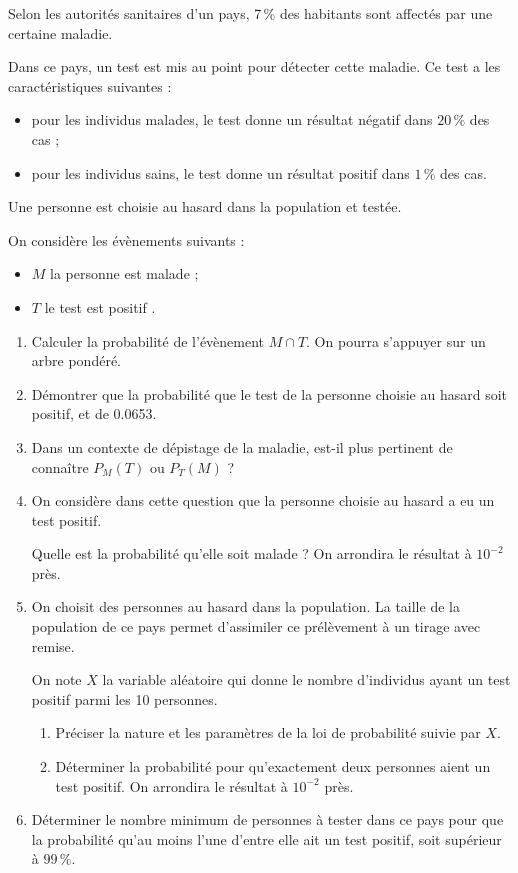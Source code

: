 Selon les autorités sanitaires d'un pays, 7\,\% des habitants sont affectés par une certaine maladie.

Dans ce pays, un test est mis au point pour détecter cette maladie. Ce test a les caractéristiques suivantes :
%
\begin{itemize}
	\item pour les individus malades, le test donne un résultat négatif dans $20 \,\%$ des cas ;
	\item pour les individus sains, le test donne un résultat positif dans $1\,\%$ des cas.
\end{itemize}
%
Une personne est choisie au hasard dans la population et testée.

On considère les évènements suivants :
%
\begin{itemize}
	\item $M$ \og la personne est malade \fg{} ;
	\item $T$ \og le test est positif \fg{}.
\end{itemize}

\begin{enumerate}
	\item Calculer la probabilité de l'évènement $M \cap T$. On pourra s'appuyer sur un arbre pondéré.
	\item Démontrer que la probabilité que le test  de la personne choisie au hasard soit positif, et de \num{0,0653}.
	\item Dans un contexte de dépistage de la maladie, est-il plus pertinent de connaître $P_M(T)$ ou $P_T(M)$ ?
	\item On considère dans cette question que la personne choisie au hasard a eu un test positif.
	
	Quelle est la probabilité qu'elle soit malade ? On arrondira le résultat à $10^{-2}$ près.
	\item On choisit des personnes au hasard dans la population. La taille de la population de ce pays permet d'assimiler ce prélèvement à un tirage avec remise.
	
	On note $X$ la variable aléatoire qui donne le nombre d'individus ayant un test positif parmi les 10 personnes. 
	\begin{enumerate}
		\item Préciser la nature et les paramètres de la loi de probabilité suivie par $X$.
		\item Déterminer la probabilité pour qu'exactement deux personnes aient un test positif. On arrondira le résultat à $10^{-2}$ près.
	\end{enumerate}	
	\item Déterminer le nombre minimum de personnes à tester dans ce pays pour que la probabilité qu'au moins l'une d'entre elle ait un test positif, soit supérieur à $99\,\%$.
\end{enumerate}

